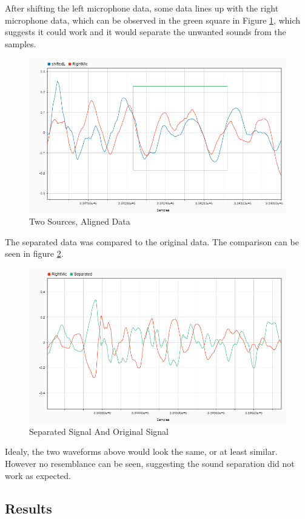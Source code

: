 After shifting the left microphone data, some data lines up with the right 
microphone data, which can be observed in the green square in Figure \ref{fig:2sourcesShifted}, 
which suggests it could work and it would separate the unwanted sounds from the samples. 

\begin{figure}[htp]
  \centering
  \includegraphics[width=1\linewidth]{Illustrations/twoSourcesShiftedandOriginal.png}
  \caption{Two Sources, Aligned Data}
  \label{fig:2sourcesShifted}
\end{figure}
\newpage
The separated data was compared to the original data. The comparison can be seen in figure \ref{fig:2sourcesSeparated}.
\begin{figure}[htp]
  \centering
  \includegraphics[width=0.7\linewidth]{Illustrations/twoSourcesSeparatedandOriginal.png}
  \caption{Separated Signal And Original Signal}
  \label{fig:2sourcesSeparated}
\end{figure}

Idealy, the two waveforms above would look the same, or at least similar. However
no resemblance can be seen, suggesting the sound separation did not work as 
expected.

\subsection*{Results}


